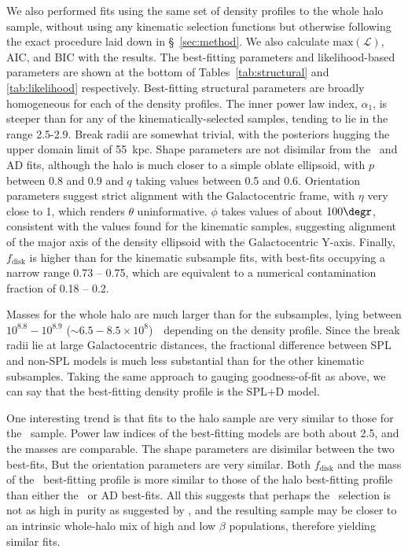 We also performed fits using the same set of density profiles to the whole halo sample, without using any kinematic selection functions but otherwise following the exact procedure laid down in \S~\ref{sec:method}. We also calculate $\mathrm{max}(\mathcal{L})$, AIC, and BIC with the results. The best-fitting parameters and likelihood-based parameters are shown at the bottom of Tables~\ref{tab:structural} and \ref{tab:likelihood} respectively. Best-fitting structural parameters are broadly homogeneous for each of the density profiles. The inner power law index, $\alpha_{1}$, is steeper than for any of the kinematically-selected samples, tending to lie in the range 2.5-2.9. Break radii are somewhat trivial, with the posteriors hugging the upper domain limit of 55~kpc. Shape parameters are not disimilar from the \eLz\ and AD fits, although the halo is much closer to a simple oblate ellipsoid, with $p$ between 0.8 and 0.9 and $q$ taking values between 0.5 and 0.6. Orientation parameters suggest strict alignment with the Galactocentric frame, with $\eta$ very close to 1, which renders $\theta$ uninformative. $\phi$ takes values of about $100\degr$, consistent with the values found for the kinematic samples, suggesting alignment of the major axis of the density ellipsoid with the Galactocentric Y-axis. Finally, $f_\mathrm{disk}$ is higher than for the kinematic subsample fits, with best-fits occupying a narrow range 0.73 -- 0.75, which are equivalent to a numerical contamination fraction of 0.18 -- 0.2.

Masses for the whole halo are much larger than for the \gse subsamples, lying between $10^{8.8}-10^{8.9}$ ($\sim 6.5-8.5\times10^{8}$)~\Msun\ depending on the density profile. Since the break radii lie at large Galactocentric distances, the fractional difference between SPL and non-SPL models is much less substantial than for the other kinematic subsamples. Taking the same approach to gauging goodness-of-fit as above, we can say that the best-fitting density profile is the SPL+D model.

One interesting trend is that fits to the halo sample are very similar to those for the \JRLz\ sample. Power law indices of the best-fitting models are both about 2.5, and the masses are comparable. The shape parameters are disimilar between the two best-fits, But the orientation parameters are very similar. Both $f_\mathrm{disk}$ and the mass of the \JRLz\ best-fitting profile is more similar to those of the halo best-fitting profile than either the \eLz\ or AD best-fits. All this suggests that perhaps the \JRLz\ selection is not as high in purity as suggested by \cite{lane22}, and the resulting sample may be closer to an intrinsic whole-halo mix of high and low $\beta$ populations, therefore yielding similar fits.

